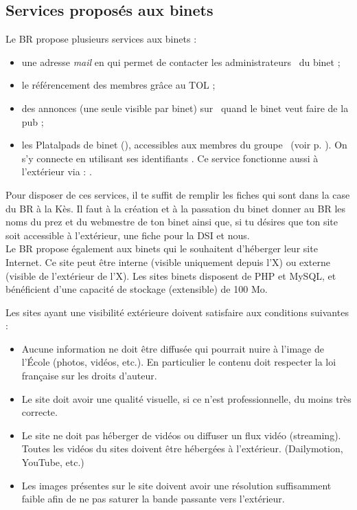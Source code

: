 \subsection{Services propos\'es aux binets}

Le BR propose plusieurs services aux binets :
\begin{itemize}
\item une adresse \emph{mail} en  qui permet de contacter les administrateurs \fkz\ du binet ;
\item le référencement des membres grâce au TOL ;
\item des annonces (une seule visible par binet) sur \fkz\ quand le binet veut faire de la pub ;
\item les Platalpads de binet (), accessibles aux membres du groupe \fkz\ (voir p. \pageref{platalpad}).
On s'y connecte en utilisant ses identifiants \fkz. Ce service fonctionne aussi \`a l'ext\'erieur via : \newline
{}.
\end{itemize}

Pour disposer de ces services, il te suffit de remplir les fiches qui sont dans la case du BR à la Kès. Il faut à la création et à la passation du binet
donner au BR les noms du prez et du webmestre de ton binet ainsi que, si tu désires que ton site soit accessible à l'extérieur, une fiche pour la DSI et nous.\\

\vspace{4mm}
Le BR propose également aux binets qui le souhaitent d'héberger leur site Internet. Ce site peut être interne (visible uniquement depuis l'X) ou externe (visible de l'extérieur de l'X).
Les sites binets disposent de PHP et MySQL, et bénéficient d'une capacité de stockage (extensible) de 100 Mo.

Les sites ayant une visibilité extérieure doivent satisfaire aux conditions suivantes :
\begin{itemize}
    \item Aucune information ne doit être diffusée qui pourrait nuire à l'image de l’École (photos, vidéos, etc.). En particulier le contenu doit respecter la loi française sur les droits d'auteur.
    \item Le site doit avoir une qualité visuelle, si ce n'est professionnelle, du moins très correcte.
    \item Le site ne doit pas héberger de vidéos ou diffuser un flux vidéo (streaming). Toutes les vidéos du sites doivent être hébergées à l'extérieur. (Dailymotion, YouTube, etc.)
    \item Les images présentes sur le site doivent avoir une résolution suffisamment faible afin de ne pas saturer la bande passante vers l'extérieur. 
\end{itemize}

